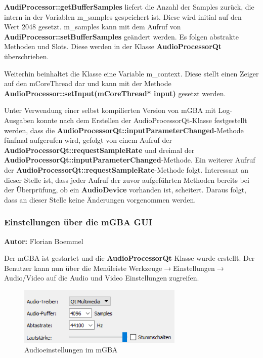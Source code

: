 \documentclass[11pt,a4paper]{scrartcl}
\newcommand{\AutorFlorian} {
    \vspace{-4mm}
    \large \textbf{Autor:} Florian Boemmel \normalsize
    \vspace{2mm}
}
\begin{document}
\textbf{AudiProcessor::getBufferSamples} liefert die Anzahl der Samples zur\"uck, die intern in der Variablen m\_samples gespeichert ist. Diese wird initial auf den Wert 2048 gesetzt. m\_samples kann mit dem Aufruf von \textbf{AudiProcessor::setBufferSamples} ge\"andert werden. Es folgen abstrakte Methoden und Slots. Diese werden in der Klasse \textbf{AudioProcessorQt} \"uberschrieben.

Weiterhin beinhaltet die Klasse eine Variable m\_context. Diese stellt einen Zeiger auf den mCoreThread dar und kann mit der Methode \textbf{AudioProcessor::setInput(mCoreThread* input)} gesetzt werden. 

Unter Verwendung einer selbst kompilierten Version von mGBA mit Log-Ausgaben konnte nach dem Erstellen der AudioProcessorQt-Klasse festgestellt werden, dass die \textbf{AudioProcessorQt::inputParameterChanged}-Methode f\"unfmal aufgerufen wird, gefolgt von einem Aufruf der \textbf{AudioProcessorQt::requestSampleRate} und dreimal der \textbf{AudioProcessorQt::inputParameterChanged}-Methode. Ein weiterer Aufruf der \textbf{AudioProcessorQt::requestSampleRate}-Methode folgt. Interessant an dieser Stelle ist, dass jeder Aufruf der zuvor aufgef\"uhrten Methoden bereits bei der \"Uberpr\"ufung, ob ein \textbf{AudioDevice} vorhanden ist, scheitert. 
Daraus folgt, dass an dieser Stelle keine \"Anderungen vorgenommen werden.

\subsubsection{Einstellungen \"uber die mGBA GUI} \label{kapitelEinstellungenMGBA}
\AutorFlorian

Der mGBA ist gestartet und die \textbf{AudioProcessorQt}-Klasse wurde erstellt. Der Benutzer kann nun \"uber die Men\"uleiste Werkzeuge$\rightarrow$Einstellungen$\rightarrow$Audio/Video auf die Audio und Video Einstellungen zugreifen.

\begin{figure}[h!]
    \centering
    \includegraphics[width=0.7\textwidth]{Audioeinstellungen}
    \caption{Audioeinstellungen im mGBA}
    \label{fig:audioeinstellungen}
\end{figure}
\end{document}
